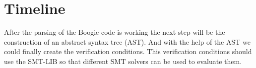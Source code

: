 \documentclass[paper=a4, fontsize=12pt]{scrartcl}
\begin{document}
\section{Timeline}
After the parsing of the Boogie code is working the next step will be the construction of an abstract syntax tree (AST). And with the help of the AST we could finally create the verification conditions. This verification conditions should use the SMT-LIB so that different SMT solvers can be used to evaluate them. 
\end{document}
